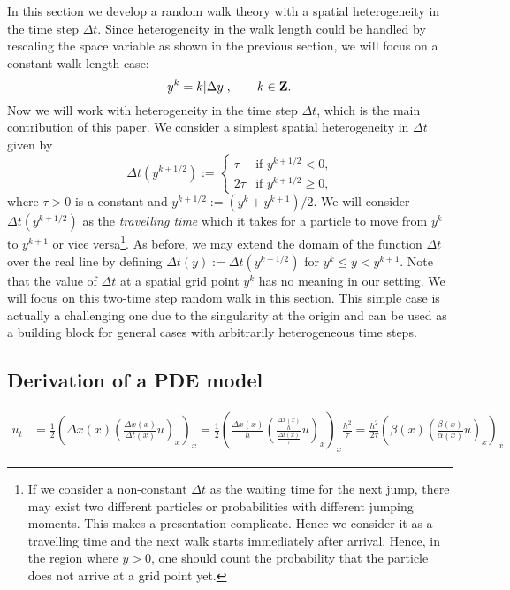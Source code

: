 \documentclass[11pt]{amsart}
\def\t{{\tau}}
\def\l{{h}}
\def\Z{\mathbb{Z}}
\def\Z{{\bf Z}}
\begin{document}
In this section we develop a random walk theory with a spatial heterogeneity in the time step $\Delta t$. Since heterogeneity in the walk length could be handled by rescaling the space variable as shown in the previous section, we will focus on a constant walk length case:
\begin{equation*}\label{y^k}
y^k=k|\Delta y|,\qquad k\in\Z.
\end{equation*}
Now we will work with heterogeneity in the time step $\Delta t$, which is the main contribution of this paper. We consider a simplest spatial heterogeneity in $\Delta t$ given by
\begin{equation*}\label{gamma}
\Delta t(y^{k+1/2}):=
\begin{cases}
\tau & \text{if $y^{k+1/2}<0$,}\\
2\tau & \text{if $y^{k+1/2}\geq 0$,}
\end{cases}
\end{equation*}
where $\tau>0$ is a constant and $y^{k+1/2}:=(y^k+y^{k+1})/2$. We will consider $\Delta t(y^{k+1/2})$ as the \emph{travelling time} which it takes for a particle to move from $y^k$ to $y^{k+1}$ or vice versa\footnote{If we consider a non-constant $\Delta t$ as the waiting time for the next jump, there may exist two different particles or probabilities with different jumping moments. This makes a presentation complicate. Hence we consider it as a travelling time and the next walk starts immediately after arrival. Hence, in the region where $y>0$, one should count the probability that the particle does not arrive at a grid point yet.}. As before, we may extend  the domain of the function $\Delta t$ over the real line by defining $\Delta t(y):=\Delta t(y^{k+1/2})$ for $y^k\leq y<y^{k+1}$. Note that the value of $\Delta t$ at a spatial grid point $y^k$ has no meaning in our setting. We will focus on this two-time step random walk in this section. This simple case is actually a challenging one due to the singularity at the origin and can be used as a building block for general cases with arbitrarily heterogeneous time steps.

\subsection{Derivation of a PDE model}


\begin{align*}
 u_t &= \frac{1}{2} \left( \Delta x(x) \left( \frac{\Delta x(x)}{\Delta t(x)} u \right)_x\right)_x= \frac{1}{2} \left( \tfrac{\Delta x(x)}{\l} \left( \frac{\tfrac{\Delta x(x)}{\l}}{\tfrac{\Delta t(x)}{\tau}} u \right)_x\right)_x \frac{\l^2}{\t} =  \frac{\l^2}{2\t} \left( \beta(x) \left( \frac{\beta(x)}{\alpha(x)} u \right)_x\right)_x
\end{align*}
\end{document}
